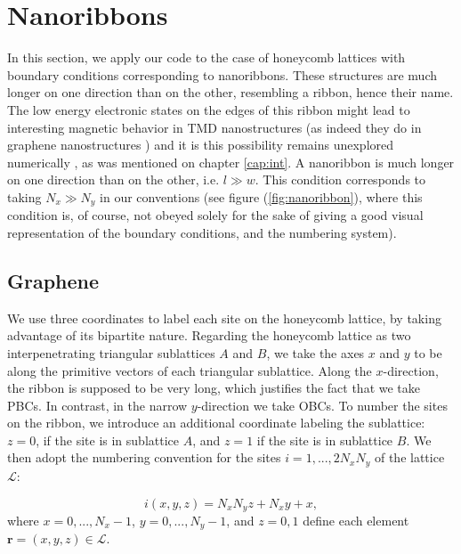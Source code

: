 \section{Nanoribbons}
\label{sec:nanoribbon}

In this section, we apply our code to the case of honeycomb lattices with boundary conditions corresponding to nanoribbons. These structures are much longer on one direction than on the other, resembling a ribbon, hence their name.
The low energy electronic states on the edges of this ribbon might lead to interesting magnetic behavior in \ac{TMD} nanostructures (as indeed they do in graphene nanostructures \cite{yazyev_emergence_2010}) and it is this possibility remains unexplored numerically \cite{feldner_dynamical_2011, golor_quantum_2013}, as was mentioned on chapter \ref{cap:int}.
A nanoribbon is much longer on one direction than on the other, i.e. $l \gg w$. 
This condition corresponds to taking $N_x \gg N_y$ in our conventions (see figure (\ref{fig:nanoribbon}), where this condition is, of course, not obeyed solely for the sake of giving a good visual representation of the boundary conditions, and the numbering system).

\subsection{Graphene}
\label{sec:graphene}

We use three coordinates to label each site on the honeycomb lattice, by taking advantage of its bipartite nature.
Regarding the honeycomb lattice as two interpenetrating triangular sublattices $A$ and $B$, we take the axes $x$ and $y$ to be along the primitive vectors of each triangular sublattice.
Along the $x$-direction, the ribbon is supposed to be very long, which justifies the fact that we take \acp{PBC}.
In contrast, in the narrow $y$-direction we take \acp{OBC}.
To number the sites on the ribbon, we introduce an additional coordinate labeling the sublattice: $z = 0$, if the site is in sublattice $A$, and $z = 1$ if the site is in sublattice $B$.
We then adopt the numbering convention for the sites $i = 1, ..., 2 N_x N_y$ of the lattice $\mathcal{L}$:

\begin{equation}\label{eq:numbering}
i (x, y, z) = N_x N_y z + N_x y + x,
\end{equation}
where $x = 0, ..., N_x - 1$, $y = 0, ..., N_y - 1$, and $z = 0, 1$ define each element $\bm r = (x, y, z) \in \mathcal{L}$.

